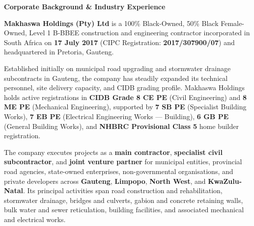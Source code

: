 \documentclass[a4paper,11pt]{article}
\begin{document}
\noindent
\begin{minipage}[t]{0.63\textwidth}
    \vspace{0pt}
    {\large\bfseries\color{mhnavy} Corporate Background \& Industry Experience}
    \vspace{0.10cm}

    {\fontsize{8.8pt}{12.5pt}\selectfont\color{mhtext}
    \textbf{Makhaswa Holdings (Pty) Ltd} is a 100\% Black-Owned, 50\% Black Female-Owned, Level 1 B-BBEE construction and engineering contractor incorporated in South Africa on \textbf{17 July 2017} (CIPC Registration: \textbf{2017/307900/07}) and headquartered in Pretoria, Gauteng.
    }

    \vspace{0.16cm}

    {\fontsize{8.8pt}{12.5pt}\selectfont\color{mhtext}
    Established initially on municipal road upgrading and stormwater drainage subcontracts in Gauteng, the company has steadily expanded its technical personnel, site delivery capacity, and CIDB grading profile. Makhaswa Holdings holds active registrations in \textbf{CIDB Grade 8 CE PE} (Civil Engineering) and \textbf{8 ME PE} (Mechanical Engineering), supported by \textbf{7 SB PE} (Specialist Building Works), \textbf{7 EB PE} (Electrical Engineering Works --- Building), \textbf{6 GB PE} (General Building Works), and \textbf{NHBRC Provisional Class 5} home builder registration.
    }

    \vspace{0.16cm}

    {\fontsize{8.8pt}{12.5pt}\selectfont\color{mhtext}
    The company executes projects as a \textbf{main contractor}, \textbf{specialist civil subcontractor}, and \textbf{joint venture partner} for municipal entities, provincial road agencies, state-owned enterprises, non-governmental organisations, and private developers across \textbf{Gauteng}, \textbf{Limpopo}, \textbf{North West}, and \textbf{KwaZulu-Natal}. Its principal activities span road construction and rehabilitation, stormwater drainage, bridges and culverts, gabion and concrete retaining walls, bulk water and sewer reticulation, building facilities, and associated mechanical and electrical works.
    }
\end{minipage}
\hfill
\end{document}
